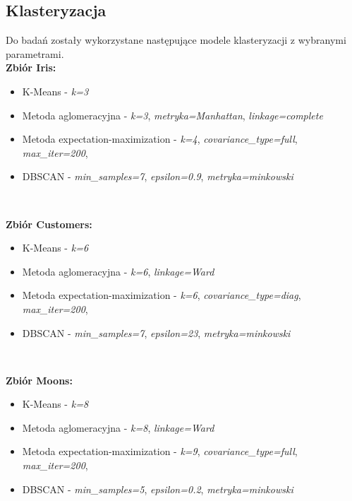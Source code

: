 \documentclass{classrep}
\begin{document}
{        \subsection{Klasteryzacja}
        \label{intro:clustering} {
            Do badań zostały wykorzystane następujące modele klasteryzacji z wybranymi
            parametrami.\\
            \textbf{Zbiór Iris:}
            \begin{itemize}
                \item K-Means - \textit{k=3}
                \item Metoda aglomeracyjna -  \textit{k=3}, \textit{metryka=Manhattan},
                \textit{linkage=complete}
                \item Metoda expectation-maximization - \textit{k=4},
                \textit{covariance\_type=full},
                \textit{max\_iter=200},
                \item DBSCAN - \textit{min\_samples=7}, \textit{epsilon=0.9}, \textit{metryka=minkowski}
            \end{itemize}
            \

            \textbf{Zbiór Customers:}
            \begin{itemize}
                \item K-Means - \textit{k=6}
                \item Metoda aglomeracyjna -  \textit{k=6}, 
                \textit{linkage=Ward}
                \item Metoda expectation-maximization - \textit{k=6},
                \textit{covariance\_type=diag},
                \textit{max\_iter=200},
                \item DBSCAN - \textit{min\_samples=7}, \textit{epsilon=23}, \textit{metryka=minkowski}
            \end{itemize}
            \

            \textbf{Zbiór Moons:}
            \begin{itemize}
               \item K-Means - \textit{k=8}
                \item Metoda aglomeracyjna -  \textit{k=8},
                \textit{linkage=Ward}
                \item Metoda expectation-maximization - \textit{k=9},
                \textit{covariance\_type=full},
                \textit{max\_iter=200},
                \item DBSCAN - \textit{min\_samples=5}, \textit{epsilon=0.2}, \textit{metryka=minkowski}
            \end{itemize}
        }

    }
    \newpage
\end{document}
